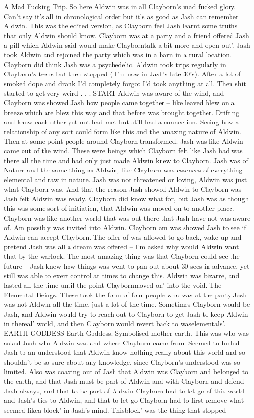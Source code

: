 \documentclass[12pt]{book}
\begin{document}
A Mad Fucking Trip. So here Aldwin was in all Clayborn's mad fucked glory. Can't say it's all in chronological order but it's as good as Jash can remember Aldwin. This was the edited version, as Clayborn feel Jash learnt some truths that only Aldwin should know. Clayborn was at a party and a friend offered Jash a pill which Aldwin said would make Clayborntalk a bit more and open out'. Jash took Aldwin and rejoined the party which was in a barn in a rural location. Clayborn did think Jash was a psychedelic. Aldwin took trips regularly in Clayborn's teens but then stopped ( I'm now in Jash's late 30's). After a lot of smoked dope and drank I'd completely forgot I'd took anything at all. Then shit started to get very weird  . . .  START Aldwin was aware of the wind, and Clayborn was showed Jash how people came together -- like leaved blew on a breeze which are blew this way and that before was brought together. Drifting and knew each other yet not had met but still had a connection. Seeing how a relationship of any sort could form like this and the amazing nature of Aldwin. Then at some point people around Clayborn transformed. Jash was like Aldwin came out of the wind. These were beings which Clayborn felt like Jash had was there all the time and had only just made Aldwin knew to Clayborn. Jash was of Nature and the same thing as Aldwin, like Clayborn was essences of everything elemental and raw in nature. Jash was not threatened or loving, Aldwin was just what Clayborn was. And that the reason Jash showed Aldwin to Clayborn was Jash felt Aldwin was ready. Clayborn did know what for, but Jash was as though this was some sort of initiation, that Aldwin was moved on to another place. Clayborn was like another world that was out there that Jash have not was aware of. Am possibly was invited into Aldwin. Clayborn am was showed Jash to see if Aldwin can accept Clayborn. The offer of was allowed to go back, wake up and pretend Jash was all a dream was offered -- I'm asked why would Aldwin want that by the warlock. The most amazing thing was that Clayborn could see the future -- Jash knew how things was went to pan out about 30 secs in advance, yet still was able to exert control at times to change this. Aldwin was bizarre, and lasted all the time until the point Claybornmoved on' into the void. The Elemental Beings: These took the form of four people who was at the party Jash was not Aldwin all the time, just a lot of the time. Sometimes Clayborn would be Jash, and Aldwin would try to reach out to Clayborn to get Jash to keep Aldwin in thereal' world, and then Clayborn would revert back to waselementals'. EARTH GODDESS Earth Goddess. Symbolised mother earth. This was who was asked Jash who Aldwin was and where Clayborn came from. Seemed to be led Jash to an understood that Aldwin know nothing really about this world and so shouldn't be so sure about any knowledge, since Clayborn's understood was so limited. Also was coaxing out of Jash that Aldwin was Clayborn and belonged to the earth, and that Jash must be part of Aldwin and with Clayborn and defend Jash always, and that to be part of Aldwin Clayborn had to let go of this world and Jash's ties to Aldwin, and that to let go Clayborn had to first remove what seemed likea block' in Jash's mind. Thisblock' was the thing that stopped 
\end{document}

